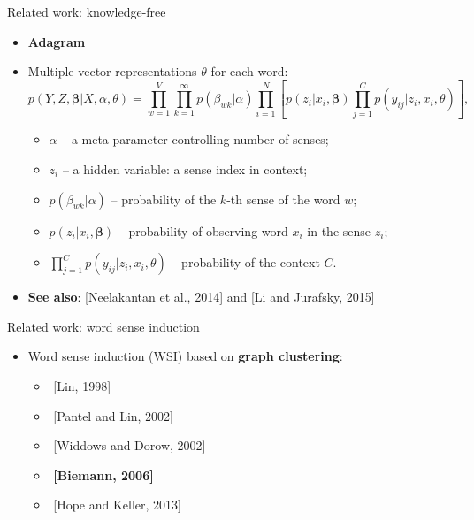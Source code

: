 \documentclass{beamer}
\begin{document}
\begin{frame}{Related work: knowledge-free}

\begin{itemize}
\item \textbf{Adagram}~\cite{bartunov2016breaking}
\item Multiple vector representations $\theta$ for each word:
 $$p(Y,Z,\mathbf{\beta}|X,\alpha,\theta) = \prod_{w=1}^{V} \prod_{k=1}^{\infty} p(\beta_{wk}|\alpha) \prod_{i=1}^N [p(z_i|x_i,\mathbf{\beta}) \prod_{j=1}^C p(y_{ij}|z_i,x_i,\theta)],$$ 
\begin{itemize}
\item $\alpha$ -- a meta-parameter controlling number of senses;
\item $z_i$ -- a hidden variable: a sense index in context; 
\item $p(\beta_{wk}|\alpha)$ -- probability of the $k$-th sense of the word $w$;
\item $p(z_i|x_i,\mathbf{\beta})$ -- probability of observing word $x_i$ in the sense $z_i$;
\item $\prod_{j=1}^C p(y_{ij}|z_i,x_i,\theta)$ -- probability of the context $C$.
\end{itemize}

\pause 
\item \alert{\textbf{See also}}: [Neelakantan et al., 2014] and [Li and Jurafsky, 2015]

\end{itemize}
	
\end{frame}


\begin{frame}{Related work: word sense induction}

\begin{itemize}
	\item Word sense induction (WSI) based on \alert{\textbf{graph clustering}}:  
	\begin{itemize}
	\item $ $ [Lin, 1998]
	\item $ $ [Pantel and Lin, 2002]
	\item $ $ [Widdows and Dorow, 2002]
	\item $ $ \textbf{[Biemann, 2006]}
	\item $ $ [Hope and Keller, 2013]
	\end{itemize}
	
\end{itemize}
	

\end{frame}
\end{document}
